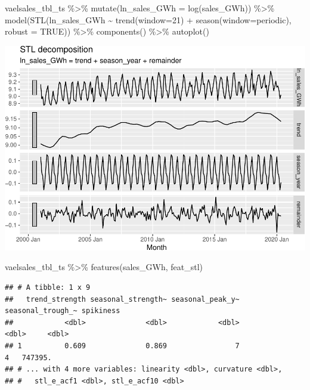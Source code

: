 \documentclass[
]{book}
\newenvironment{Shaded}{\begin{snugshade}}{\end{snugshade}}
\newcommand{\AttributeTok}[1]{\textcolor[rgb]{0.77,0.63,0.00}{#1}}
\newcommand{\ConstantTok}[1]{\textcolor[rgb]{0.00,0.00,0.00}{#1}}
\newcommand{\DecValTok}[1]{\textcolor[rgb]{0.00,0.00,0.81}{#1}}
\newcommand{\FunctionTok}[1]{\textcolor[rgb]{0.00,0.00,0.00}{#1}}
\newcommand{\NormalTok}[1]{#1}
\newcommand{\SpecialCharTok}[1]{\textcolor[rgb]{0.00,0.00,0.00}{#1}}
\newcommand{\StringTok}[1]{\textcolor[rgb]{0.31,0.60,0.02}{#1}}
\begin{document}
\begin{Shaded}
\begin{Highlighting}[]
\NormalTok{vaelsales\_tbl\_ts }\SpecialCharTok{\%\textgreater{}\%}
  \FunctionTok{mutate}\NormalTok{(}\AttributeTok{ln\_sales\_GWh =} \FunctionTok{log}\NormalTok{(sales\_GWh)) }\SpecialCharTok{\%\textgreater{}\%}
  \FunctionTok{model}\NormalTok{(}\FunctionTok{STL}\NormalTok{(ln\_sales\_GWh }\SpecialCharTok{\textasciitilde{}} \FunctionTok{trend}\NormalTok{(}\AttributeTok{window=}\DecValTok{21}\NormalTok{) }\SpecialCharTok{+} \FunctionTok{season}\NormalTok{(}\AttributeTok{window=}\StringTok{\textquotesingle{}periodic\textquotesingle{}}\NormalTok{),}
    \AttributeTok{robust =} \ConstantTok{TRUE}\NormalTok{)) }\SpecialCharTok{\%\textgreater{}\%}
  \FunctionTok{components}\NormalTok{() }\SpecialCharTok{\%\textgreater{}\%}
  \FunctionTok{autoplot}\NormalTok{()}
\end{Highlighting}
\end{Shaded}

\includegraphics{graphics/perform multiplicative STL decomposition of the VA electricity sales time series 2-1.pdf}

\begin{Shaded}
\begin{Highlighting}[]
\NormalTok{vaelsales\_tbl\_ts }\SpecialCharTok{\%\textgreater{}\%} \FunctionTok{features}\NormalTok{(sales\_GWh, feat\_stl)}
\end{Highlighting}
\end{Shaded}

\begin{verbatim}
## # A tibble: 1 x 9
##   trend_strength seasonal_strength~ seasonal_peak_y~ seasonal_trough_~ spikiness
##            <dbl>              <dbl>            <dbl>             <dbl>     <dbl>
## 1          0.609              0.869                7                 4   747395.
## # ... with 4 more variables: linearity <dbl>, curvature <dbl>,
## #   stl_e_acf1 <dbl>, stl_e_acf10 <dbl>
\end{verbatim}
\end{document}
